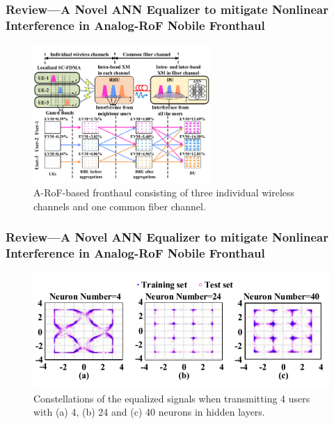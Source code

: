 \documentclass[t]{beamer}
\begin{document}
\begin{frame}
    \frametitle{Review---A Novel ANN Equalizer to mitigate Nonlinear Interference in Analog-RoF Nobile Fronthaul \cite{Liu2018a}}
    \begin{figure}
        \includegraphics[width=0.6\textwidth]{novelANN.PNG}
        \caption{A-RoF-based fronthaul consisting of three individual wireless channels and one common fiber channel.}
    \end{figure}
\end{frame}

\begin{frame}
    \frametitle{Review---A Novel ANN Equalizer to mitigate Nonlinear Interference in Analog-RoF Nobile Fronthaul \cite{Liu2018a}}
    \begin{figure}
        \includegraphics[width=\textwidth]{novelANNTraining.PNG}
        \caption{Constellations of the equalized signals when transmitting 4 users with (a) 4, (b) 24 and (c) 40 neurons in hidden layers.}
    \end{figure}
\end{frame}
\end{document}
